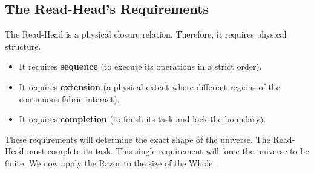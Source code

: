 \documentclass[11pt]{article}
\theoremstyle{canonstyle}
\begin{document}
\subsection{The Read-Head's Requirements}

The Read-Head is a physical closure relation. Therefore, it requires physical structure. 
\begin{itemize}
    \item It requires \textbf{sequence} (to execute its operations in a strict order).
    \item It requires \textbf{extension} (a physical extent where different regions of the continuous fabric interact).
    \item It requires \textbf{completion} (to finish its task and lock the boundary).
\end{itemize}

These requirements will determine the exact shape of the universe. The Read-Head must complete its task. This single requirement will force the universe to be finite. We now apply the Razor to the size of the Whole.

\newpage
\end{document}
